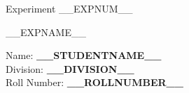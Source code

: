 \documentclass[12pt]{article}
\newcommand{\expnum}{__EXPNUM__}
\newcommand{\expname}{__EXPNAME__}
\newcommand{\studentname}{__STUDENTNAME__}
\newcommand{\division}{__DIVISION__}
\newcommand{\rollnumber}{__ROLLNUMBER__}
\begin{document}
\thispagestyle{empty}
\vspace*{\fill}
\begin{center}
    {\fontsize{40}{48} Experiment \expnum\par}
    \vspace{0.5cm}
    {\fontsize{24}{29} \expname\par}
\end{center}
\vspace*{\fill}
\noindent
\large
Name: \textbf{\studentname}\\
Division: \textbf{\division}\\
Roll Number: \textbf{\rollnumber}
\vspace{1cm}
\end{document}
